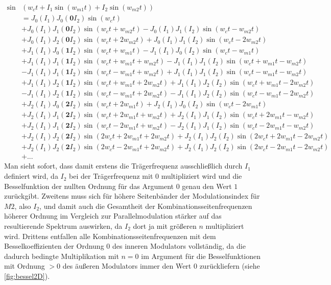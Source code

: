 \begin{equation}
\begin{split}
\sin&(w_ct + I_1\sin(w_{m1}t) + I_2\sin(w_{m2}t)) \\
&= J_0(I_1)J_0(\mathbf{0}I_2)\sin(w_ct) \\
&+ J_0(I_1)J_1(\mathbf{0}I_2)\sin(w_ct + w_{m2}t) - J_0(I_1)J_1(I_2)\sin(w_ct - w_{m2}t) \\
&+ J_0(I_1)J_2(\mathbf{0}I_2)\sin(w_ct + 2w_{m2}t) + J_0(I_1)J_1(I_2)\sin(w_ct - 2w_{m2}t) \\
&+ J_1(I_1)J_0(\mathbf{1}I_2)\sin(w_ct + w_{m1}t) - J_1(I_1)J_0(I_2)\sin(w_ct - w_{m1}t) \\
&+ J_1(I_1)J_1(\mathbf{1}I_2)\sin(w_ct + w_{m1}t + w_{m2}t) - J_1(I_1)J_1(I_2)\sin(w_ct + w_{m1}t - w_{m2}t) \\
&- J_1(I_1)J_1(\mathbf{1}I_2)\sin(w_ct - w_{m1}t + w_{m2}t) + J_1(I_1)J_1(I_2)\sin(w_ct - w_{m1}t - w_{m2}t) \\
&+ J_1(I_1)J_2(\mathbf{1}I_2)\sin(w_ct + w_{m1}t + 2w_{m2}t) + J_1(I_1)J_2(I_2)\sin(w_ct + w_{m1}t - 2w_{m2}t) \\
&- J_1(I_1)J_2(\mathbf{1}I_2)\sin(w_ct - w_{m1}t + 2w_{m2}t) - J_1(I_1)J_2(I_2)\sin(w_ct - w_{m1}t - 2w_{m2}t) \\
&+ J_2(I_1)J_0(\mathbf{2}I_2)\sin(w_ct + 2w_{m1}t) + J_2(I_1)J_0(I_2)\sin(w_ct - 2w_{m1}t) \\
&+ J_2(I_1)J_1(\mathbf{2}I_2)\sin(w_ct + 2w_{m1}t + w_{m2}t) + J_2(I_1)J_1(I_2)\sin(w_ct + 2w_{m1}t - w_{m2}t) \\
&+ J_2(I_1)J_1(\mathbf{2}I_2)\sin(w_ct - 2w_{m1}t + w_{m2}t) - J_2(I_1)J_1(I_2)\sin(w_ct - 2w_{m1}t - w_{m2}t) \\
&+ J_2(I_1)J_2(\mathbf{2}I_2)\sin(2w_ct + 2w_{m1}t + 2w_{m2}t) + J_2(I_1)J_2(I_2)\sin(2w_ct + 2w_{m1}t - 2w_{m2}t) \\
&+ J_2(I_1)J_2(\mathbf{2}I_2)\sin(2w_ct - 2w_{m1}t + 2w_{m2}t) + J_2(I_1)J_2(I_2)\sin(2w_ct - 2w_{m1}t - 2w_{m2}t) \\
&+ ... 
\end{split}
\end{equation}
\label{Kaskadenspecials}
Man sieht sofort, dass damit erstens die Trägerfrequenz ausschließlich durch $ I_1 $ definiert wird, da $ I_2 $ bei der Trägerfrequenz mit $0$ multipliziert wird und die Besselfunktion der nullten Ordnung für das Argument $0$ genau den Wert $1$ zurückgibt. Zweitens muss sich für höhere Seitenbänder der Modulationsindex für $M2$, also $ I_2 $, und damit auch die Gesamtheit der Kombinationsseitenfrequenzen höherer Ordnung im Vergleich zur Parallelmodulation stärker auf das resultierende Spektrum auswirken, da $ I_2 $ dort ja mit größeren $n$ multipliziert wird. Drittens entfallen alle Kombinationsseitenfrequenzen mit dem Besselkoeffizienten der Ordnung $0$ des inneren Modulators vollständig, da die dadurch bedingte Multiplikation mit $n = 0$ im Argument für die Besselfunktionen mit Ordnung $>0$ des äußeren Modulators immer den Wert $0$ zurückliefern (siehe \ref{fig:bessel2D}). 

